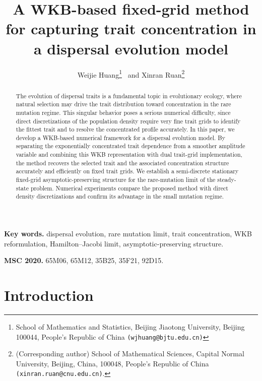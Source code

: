 \documentclass[11pt]{article}
\title{A WKB-based fixed-grid method for capturing trait concentration in a dispersal evolution model}
\author{
Weijie Huang\thanks{School of Mathematics and Statistics, Beijing Jiaotong University, Beijing 100044, People's Republic of China {\tt (wjhuang@bjtu.edu.cn)}} \ and
Xinran Ruan\thanks{(Corresponding author) School of Mathematical Sciences, Capital Normal University, Beijing, China, 100048, People's Republic of China {\tt (xinran.ruan@cnu.edu.cn)}.}
}
\begin{document}
\date{}
\maketitle

\begin{abstract}
The evolution of dispersal traits is a fundamental topic in evolutionary ecology, 
where natural selection may drive the trait distribution toward concentration in the rare mutation regime. 
This singular behavior poses a serious numerical difficulty, 
since direct discretizations of the population density require very fine trait grids to identify the fittest trait and to resolve the concentrated profile accurately. 
In this paper, we develop a WKB-based numerical framework for a dispersal evolution model. 
By separating the exponentially concentrated trait dependence from a smoother
amplitude variable and combining this WKB representation with dual trait-grid implementation, the method recovers the selected trait and
the associated concentration structure accurately and efficiently on fixed trait grids. 
We establish a semi-discrete stationary fixed-grid asymptotic-preserving structure for the rare-mutation limit of the steady-state problem.
Numerical experiments compare the proposed method with
direct density discretizations and confirm its advantage in the small mutation
regime.
\end{abstract}

{\bf Key words. } dispersal evolution, rare mutation limit, trait concentration, WKB reformulation, Hamilton--Jacobi limit, asymptotic-preserving structure.

{\bf MSC 2020. } 65M06, 65M12, 35B25, 35F21, 92D15.


\section{Introduction}
\end{document}
